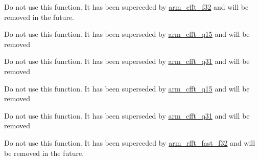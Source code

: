 \begin{DoxyRefList}
%
Do not use this function. It has been superceded by \mbox{\hyperlink{group___complex_f_f_t_gade0f9c4ff157b6b9c72a1eafd86ebf80}{arm\+\_\+cfft\+\_\+f32}} and will be removed in the future.  
\item[Global \mbox{\hyperlink{group___complex_f_f_t_ga0c2acfda3126c452e75b81669e8ad9ef}{arm\+\_\+cfft\+\_\+radix4\+\_\+init\+\_\+q15}} (\mbox{\hyperlink{structarm__cfft__radix4__instance__q15}{arm\+\_\+cfft\+\_\+radix4\+\_\+instance\+\_\+q15}} $\ast$S, uint16\+\_\+t fft\+Len, uint8\+\_\+t ifft\+Flag, uint8\+\_\+t bit\+Reverse\+Flag)]\label{deprecated__deprecated000047}%
%
Do not use this function. It has been superseded by \mbox{\hyperlink{group___complex_f_f_t_ga68cdacd2267a2967955e40e6b7ec1229}{arm\+\_\+cfft\+\_\+q15}} and will be removed  
\item[Global \mbox{\hyperlink{group___complex_f_f_t_gad5caaafeec900c8ff72321c01bbd462c}{arm\+\_\+cfft\+\_\+radix4\+\_\+init\+\_\+q31}} (\mbox{\hyperlink{structarm__cfft__radix4__instance__q31}{arm\+\_\+cfft\+\_\+radix4\+\_\+instance\+\_\+q31}} $\ast$S, uint16\+\_\+t fft\+Len, uint8\+\_\+t ifft\+Flag, uint8\+\_\+t bit\+Reverse\+Flag)]\label{deprecated__deprecated000048}%
%
Do not use this function. It has been superseded by \mbox{\hyperlink{group___complex_f_f_t_ga5a0008bd997ab6e2e299ef2fb272fb4b}{arm\+\_\+cfft\+\_\+q31}} and will be removed  
\item[Global \mbox{\hyperlink{group___complex_f_f_t_ga8d66cdac41b8bf6cefdb895456eee84a}{arm\+\_\+cfft\+\_\+radix4\+\_\+q15}} (const \mbox{\hyperlink{structarm__cfft__radix4__instance__q15}{arm\+\_\+cfft\+\_\+radix4\+\_\+instance\+\_\+q15}} $\ast$S, q15\+\_\+t $\ast$p\+Src)]\label{deprecated__deprecated000049}%
%
Do not use this function. It has been superseded by \mbox{\hyperlink{group___complex_f_f_t_ga68cdacd2267a2967955e40e6b7ec1229}{arm\+\_\+cfft\+\_\+q15}} and will be removed  
\item[Global \mbox{\hyperlink{group___complex_f_f_t_gafde3ee1f58cf393b45a9073174fff548}{arm\+\_\+cfft\+\_\+radix4\+\_\+q31}} (const \mbox{\hyperlink{structarm__cfft__radix4__instance__q31}{arm\+\_\+cfft\+\_\+radix4\+\_\+instance\+\_\+q31}} $\ast$S, q31\+\_\+t $\ast$p\+Src)]\label{deprecated__deprecated000050}%
%
Do not use this function. It has been superseded by \mbox{\hyperlink{group___complex_f_f_t_ga5a0008bd997ab6e2e299ef2fb272fb4b}{arm\+\_\+cfft\+\_\+q31}} and will be removed  
\item[Global \mbox{\hyperlink{group___real_f_f_t_ga3df1766d230532bc068fc4ed69d0fcdc}{arm\+\_\+rfft\+\_\+f32}} (const \mbox{\hyperlink{structarm__rfft__instance__f32}{arm\+\_\+rfft\+\_\+instance\+\_\+f32}} $\ast$S, float32\+\_\+t $\ast$p\+Src, float32\+\_\+t $\ast$p\+Dst)]\label{deprecated__deprecated000051}%
%
Do not use this function. It has been superceded by \mbox{\hyperlink{group___real_f_f_t_ga180d8b764d59cbb85d37a2d5f7cd9799}{arm\+\_\+rfft\+\_\+fast\+\_\+f32}} and will be removed in the future. 
\end{DoxyRefList}
